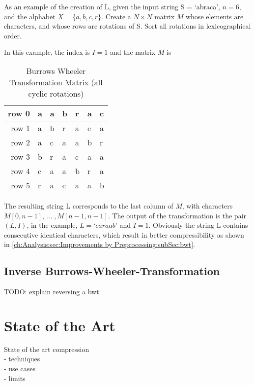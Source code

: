 \par {
As an example of the creation of L, given the input string S = ‘abraca’, $n = 6$, and the alphabet
$X = \{a,b,c,r\}$. Create a $N \times N$ matrix $M$ whose elements are characters, and
whose rows are rotations of S. Sort all rotations in lexicographical order.
}

\par{
In this example, the index is $I = 1$ and the matrix $M$ is

\begin{table}[h]
	\centering
	\begin{tabular}{r|l|l|l|l|l|l}
		row 0 & a & a & b & r & a & c\\
		\hline
		row 1 & a & b & r & a & c & a\\
		\hline
		row 2 & a & c & a & a & b & r\\
		\hline
		row 3 & b & r & a & c & a & a\\
		\hline
		row 4 & c & a & a & b & r & a\\
		\hline
		row 5 & r & a & c & a & a & b
		\label{tab:t10 bwt-example}
	\end{tabular}
	\caption{Burrows Wheeler Transformation Matrix (all cyclic rotations)}
\end{table}


The resulting string L corresponds to the last column of $M$, with characters $M[0,n -1],\: \dots \: ,M[n - 1, n - 1]$. The output of the transformation is the pair $(L, I)$, in the example, $L = ‘caraab’$ and $I = 1$. Obviously the string L contains consecutive identical characters, which result in better compressibility as shown in \ref{ch:Analysis:sec:Improvements by Preprocessing:subSec:bwt}.
}

\subsection{Inverse Burrows-Wheeler-Transformation}
\label{ch:Principles of compression:sec:Other:subSec:bwtInverse}

\par{
TODO: explain reversing a bwt
}

\section{State of the Art}
\label{ch:Principles of compression:sec:SOTA}
State of the art compression\\
- techniques\\
- use cases\\
- limits\\

